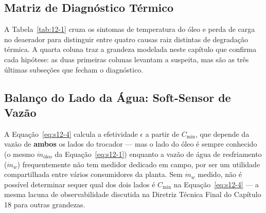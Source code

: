 \documentclass[12pt,a4paper]{article}
\numberwithin{equation}{section}
\numberwithin{table}{section}
\numberwithin{figure}{section}
\begin{document}
{	\subsection{\textbf{Matriz de Diagnóstico Térmico}}
	A Tabela~\ref{tab:12-1} cruza os sintomas de temperatura do óleo e perda de carga no deaerador para distinguir entre quatro causas raiz distintas de degradação térmica. A quarta coluna traz a grandeza modelada neste capítulo que confirma cada hipótese: as duas primeiras colunas levantam a suspeita, mas são as três últimas subseções que fecham o diagnóstico.
	\begin{table}[H]
		\centering
		\caption[Matriz de diagnóstico térmico do circuito de óleo]{Matriz de diagnóstico térmico do sistema de lubrificação e resfriamento, com a grandeza que confirma cada causa raiz.}
		\label{tab:12-1}
	\end{table}

	\subsection{\textbf{Balanço do Lado da Água: Soft-Sensor de Vazão}}
	A Equação~\eqref{eq:s12-4} calcula a efetividade $\epsilon$ a partir de $C_{\min}$, que depende da vazão de \textbf{ambos} os lados do trocador — mas o lado do óleo é sempre conhecido (o mesmo $\dot{m}_{\text{óleo}}$ da Equação~\eqref{eq:s12-1}) enquanto a vazão de água de resfriamento ($\dot{m}_w$) frequentemente não tem medidor dedicado em campo, por ser um utilidade compartilhada entre vários consumidores da planta. Sem $\dot{m}_w$ medido, não é possível determinar sequer qual dos dois lados é $C_{\min}$ na Equação~\eqref{eq:s12-4} — a mesma lacuna de observabilidade discutida na Diretriz Técnica Final do Capítulo 18 para outras grandezas.

}
\end{document}
